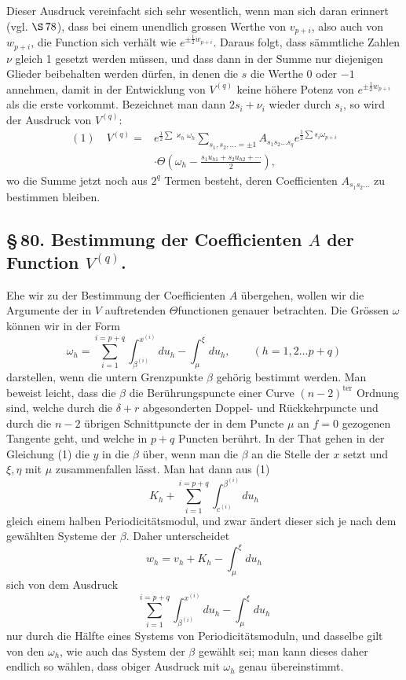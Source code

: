 \documentclass[10pt]{article}
\begin{document}
Dieser Ausdruck vereinfacht sich sehr wesentlich, wenn man sich daran erinnert (vgl. \(\S\,78\)), dass bei einem unendlich grossen Werthe von \(v_{p+i}\), also auch von \(w_{p+i}\), die Function sich verhält wie \(e^{\pm\frac12w_{p+i}}\). Daraus folgt, dass sämmtliche Zahlen \(\nu\) gleich 1 gesetzt werden müssen, und dass dann in der Summe nur diejenigen Glieder beibehalten werden dürfen, in denen die \(s\) die Werthe 0 oder \(-1\) annehmen, damit in der Entwicklung von \(V^{(q)}\) keine höhere Potenz von \(e^{\pm\frac12w_{p+i}}\) als die erste vorkommt. Bezeichnet man dann \(2s_i+\nu_i\) wieder durch \(s_i\), so wird der Ausdruck von \(V^{(q)}\):
\[
\begin{aligned}
(1)\quad V^{(q)}={}&e^{\frac12\sum\varkappa_h\omega_h}
\sum_{s_1,s_2,\ldots=\pm1} A_{s_1s_2\ldots s_q}
 e^{\frac12\sum s_i\omega_{p+i}}\\
&\cdot\Theta\left(\omega_h-\frac{s_1u_{h1}+s_2u_{h2}+\cdots}{2}\right),
\end{aligned}
\]
wo die Summe jetzt noch aus \(2^q\) Termen besteht, deren Coefficienten \(A_{s_1s_2\ldots}\) zu bestimmen bleiben.

\subsection*{\S\,80. Bestimmung der Coefficienten \(A\) der Function \(V^{(q)}\).}

Ehe wir zu der Bestimmung der Coefficienten \(A\) übergehen, wollen wir die Argumente der in \(V\) auftretenden \(\Theta\)functionen genauer betrachten. Die Grössen \(\omega\) können wir in der Form
\[
\omega_h=\sum_{i=1}^{i=p+q}\int_{\beta^{(i)}}^{x^{(i)}}du_h-\int_{\mu}^{\xi}du_h,
\qquad (h=1,2\ldots p+q)
\]
darstellen, wenn die untern Grenzpunkte \(\beta\) gehörig bestimmt werden. Man beweist leicht, dass die \(\beta\) die Berührungspuncte einer Curve \((n-2)^{\mathrm{ter}}\) Ordnung sind, welche durch die \(\delta+r\) abgesonderten Doppel- und Rückkehrpuncte und durch die \(n-2\) übrigen Schnittpuncte der in dem Puncte \(\mu\) an \(f=0\) gezogenen Tangente geht, und welche in \(p+q\) Puncten berührt. In der That gehen in der Gleichung (1) die \(y\) in die \(\beta\) über, wenn man die \(\beta\) an die Stelle der \(x\) setzt und \(\xi,\eta\) mit \(\mu\) zusammenfallen lässt. Man hat dann aus (1)
\[
K_h+\sum_{i=1}^{i=p+q}\int_{c^{(i)}}^{\beta^{(i)}}du_h
\]
gleich einem halben Periodicitätsmodul, und zwar ändert dieser sich je nach dem gewählten Systeme der \(\beta\). Daher unterscheidet
\[
w_h=v_h+K_h-\int_{\mu}^{\xi}du_h
\]
sich von dem Ausdruck
\[
\sum_{i=1}^{i=p+q}\int_{\beta^{(i)}}^{x^{(i)}}du_h-\int_{\mu}^{\xi}du_h
\]
nur durch die Hälfte eines Systems von Periodicitätsmoduln, und dasselbe gilt von den \(\omega_h\), wie auch das System der \(\beta\) gewählt sei; man kann dieses daher endlich so wählen, dass obiger Ausdruck mit \(\omega_h\) genau übereinstimmt.
\end{document}
